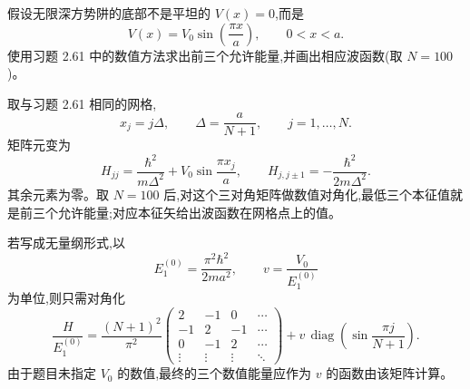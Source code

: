 \begin{question}
假设无限深方势阱的底部不是平坦的 $V(x)=0$,而是
\[
V(x)=V_0\sin\left(\frac{\pi x}{a}\right),\qquad 0<x<a .
\]
使用习题 2.61 中的数值方法求出前三个允许能量,并画出相应波函数(取 $N=100$)。
\begin{solution}
取与习题 2.61 相同的网格,
\[
x_j=j\Delta,
\qquad \Delta=\frac{a}{N+1},
\qquad j=1,\ldots,N.
\]
矩阵元变为
\[
H_{jj}=\frac{\hbar^2}{m\Delta^2}+V_0\sin\frac{\pi x_j}{a},
\qquad
H_{j,j\pm1}=-\frac{\hbar^2}{2m\Delta^2}.
\]
其余元素为零。取 $N=100$ 后,对这个三对角矩阵做数值对角化,最低三个本征值就是前三个允许能量;对应本征矢给出波函数在网格点上的值。

若写成无量纲形式,以
\[
E_1^{(0)}=\frac{\pi^2\hbar^2}{2ma^2},
\qquad v=\frac{V_0}{E_1^{(0)}}
\]
为单位,则只需对角化
\[
\frac{H}{E_1^{(0)}}=\frac{(N+1)^2}{\pi^2}
\begin{pmatrix}
2&-1&0&\cdots\\
-1&2&-1&\cdots\\
0&-1&2&\cdots\\
\vdots&\vdots&\vdots&\ddots
\end{pmatrix}
+v\,\operatorname{diag}\left(\sin\frac{\pi j}{N+1}\right).
\]
由于题目未指定 $V_0$ 的数值,最终的三个数值能量应作为 $v$ 的函数由该矩阵计算。
\end{solution}
\end{question}

